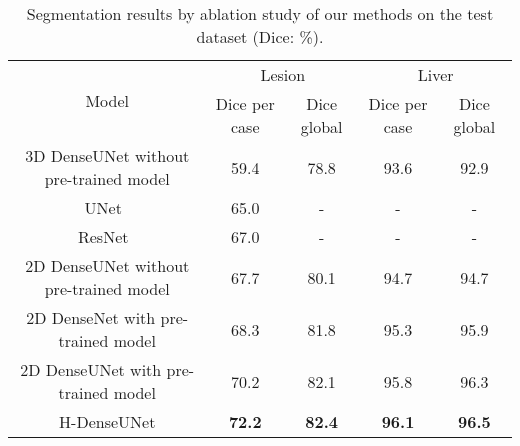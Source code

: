 \documentclass[journal]{IEEEtran}
\begin{document}
\begin{table*}[!t]
	\centering
	\caption{Segmentation results by ablation study of our methods on the test dataset (Dice: \%).}
	\label{tab:ablation study} {	
		\begin{tabular}{c|c|c|c|c}
			\hline
			\multirow{2}{*}{Model}	& \multicolumn{2}{c|}{ Lesion } & \multicolumn{2}{|c}{ Liver }  \tabularnewline
			\cline{2-5}
			& Dice per case & Dice global   &  Dice per case  & Dice global  \tabularnewline
			\hline
			3D DenseUNet without pre-trained model & 59.4 &  78.8  & 93.6  & 92.9     \tabularnewline
			\hline
			
			
			UNet~\citep{chlebus2017neural} & 65.0 & -   &  - &  -  \tabularnewline
			\hline
			ResNet~\citep{han2017automatic} & 67.0 & -  &  - &  - \tabularnewline
			\hline
			2D DenseUNet without pre-trained model  & 67.7  &  80.1  &  94.7 &  94.7 \tabularnewline
			\hline
			2D DenseNet with pre-trained model  & 68.3 &  81.8 &  95.3  &  95.9  \tabularnewline
			\hline
			2D DenseUNet with pre-trained model & 70.2 & 82.1   & 95.8 & 96.3  \tabularnewline
\hline
			H-DenseUNet  & \textbf{72.2} & \textbf{82.4} & \textbf{96.1}  &  \textbf{96.5}  \tabularnewline
			\hline	 \end{tabular}
	}
\end{table*}
\end{document}

